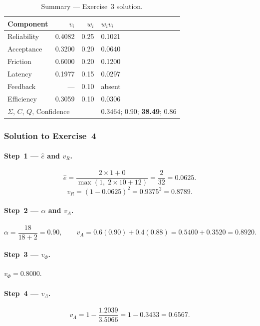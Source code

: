 \documentclass[11pt,a4paper]{article}
\begin{document}
\begin{table}[h!]
\centering
\caption{Summary --- Exercise~3 solution.}
\begin{tabular}{@{}lrrl@{}}
\toprule
Component & $v_i$ & $w_i$ & $w_iv_i$ \\
\midrule
Reliability  & 0.4082 & 0.25 & 0.1021 \\
Acceptance   & 0.3200 & 0.20 & 0.0640 \\
Friction     & 0.6000 & 0.20 & 0.1200 \\
Latency      & 0.1977 & 0.15 & 0.0297 \\
Feedback     & ---    & 0.10 & absent \\
Efficiency   & 0.3059 & 0.10 & 0.0306 \\
\midrule
\multicolumn{3}{l}{$\Sigma$, $C$, $Q$, Confidence}
  & $0.3464$;\; $0.90$;\; \textbf{38.49};\; $0.86$ \\
\bottomrule
\end{tabular}
\end{table}

\subsubsection*{Solution to Exercise~4}

\paragraph{Step~1 --- $\hat{e}$ and $v_R$.}
\[
  \hat{e} = \frac{2\times1+0}{\max(1,\;2\times10+12)} = \frac{2}{32} = 0.0625.
\]
\[
  v_R = (1-0.0625)^2 = 0.9375^2 = 0.8789.
\]

\paragraph{Step~2 --- $\alpha$ and $v_A$.}
\[
  \alpha = \frac{18}{18+2} = 0.90, \qquad
  v_A = 0.6(0.90)+0.4(0.88) = 0.5400+0.3520 = 0.8920.
\]

\paragraph{Step~3 --- $v_\Phi$.} $v_\Phi = 0.8000$.

\paragraph{Step~4 --- $v_\Lambda$.}
\[
  v_\Lambda = 1 - \frac{1.2039}{3.5066} = 1 - 0.3433 = 0.6567.
\]
\end{document}
